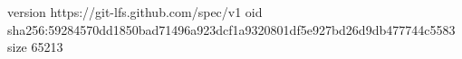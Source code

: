 version https://git-lfs.github.com/spec/v1
oid sha256:59284570dd1850bad71496a923dcf1a9320801df5e927bd26d9db477744c5583
size 65213
